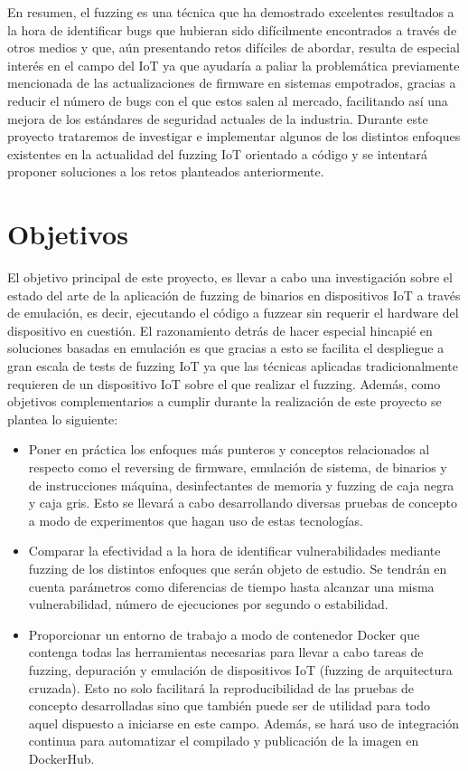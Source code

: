En resumen, el fuzzing es una técnica que ha demostrado excelentes resultados a la hora de identificar bugs 
que hubieran sido difícilmente encontrados a través de otros medios y que, aún presentando retos difíciles de abordar, resulta de especial interés en
el campo del IoT ya que ayudaría a paliar la problemática previamente mencionada de las actualizaciones de firmware en sistemas empotrados, gracias a reducir el número de bugs con el que 
estos salen al mercado, facilitando así una mejora de los estándares de seguridad actuales de la industria. Durante este proyecto trataremos de investigar
e implementar algunos de los distintos enfoques existentes en la actualidad del fuzzing IoT orientado a código y se intentará proponer 
soluciones a los retos planteados anteriormente.

\section{Objetivos}
El objetivo principal de este proyecto, es llevar a cabo una investigación sobre el estado del arte de la aplicación de fuzzing de binarios en dispositivos IoT
a través de emulación, es decir, ejecutando el código a fuzzear sin requerir el hardware del dispositivo en cuestión. El razonamiento detrás de hacer especial 
hincapié en soluciones basadas en emulación es que gracias a esto se facilita el despliegue a gran escala de tests de fuzzing IoT ya que las técnicas aplicadas 
tradicionalmente requieren de un dispositivo IoT sobre el que realizar el fuzzing.
Además, como objetivos complementarios a cumplir durante la realización de este proyecto se plantea lo siguiente:
\begin{itemize}
    \item Poner en práctica los enfoques más punteros y 
    conceptos relacionados al respecto como el reversing de firmware, emulación de sistema, de binarios y de instrucciones máquina, 
    desinfectantes de memoria y fuzzing de caja negra y caja gris. Esto se llevará a cabo desarrollando diversas pruebas de concepto a modo de 
    experimentos que hagan uso de estas tecnologías.
    \item Comparar la efectividad a la hora de identificar vulnerabilidades mediante fuzzing de los distintos enfoques que serán objeto de estudio. 
    Se tendrán en cuenta parámetros como diferencias de tiempo hasta alcanzar una misma vulnerabilidad, número de ejecuciones por segundo o estabilidad.
    \item Proporcionar un entorno de trabajo a modo de contenedor Docker que contenga todas las herramientas necesarias para llevar a cabo tareas de 
    fuzzing, depuración y emulación de dispositivos IoT (fuzzing de arquitectura cruzada). Esto no solo facilitará la reproducibilidad de las pruebas de 
    concepto desarrolladas sino que también puede ser de utilidad para todo aquel dispuesto a iniciarse en este campo. Además, se hará uso de 
    integración continua para automatizar el compilado y publicación de la imagen en DockerHub.
\end{itemize}

